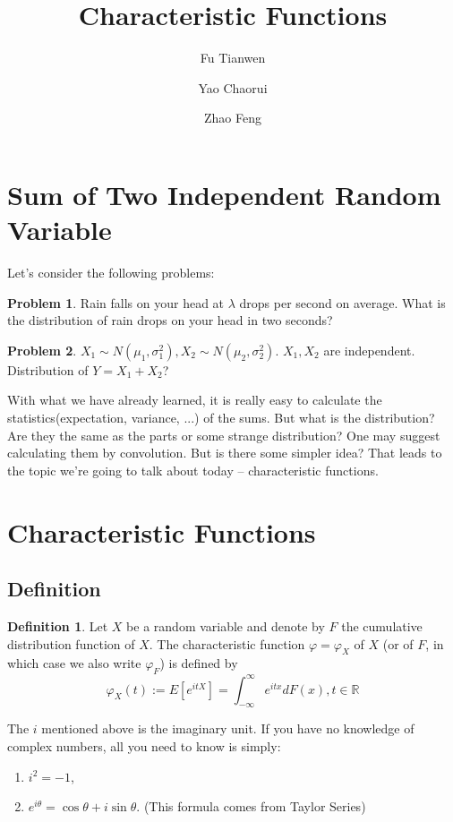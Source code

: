 \documentclass{article}
\title{Characteristic Functions}
\author{Fu Tianwen \and Yao Chaorui \and Zhao Feng}
\theoremstyle{definition}
\newtheorem{definition}{Definition}[section]
\newtheorem{problem}{Problem}
\theoremstyle{plain}
\theoremstyle{remark}
\newcommand{\reals}{\mathbb{R}}
\begin{document}
\maketitle
\section{Sum of Two Independent Random Variable}
Let's consider the following problems:
\begin{problem}
	Rain falls on your head at $\lambda$ drops per second on average. What is the distribution of rain drops on your head in two seconds?
	\label{prb:poisson}
\end{problem}
\begin{problem}
	$X_1\sim N(\mu_1,\sigma_1^2), X_2\sim N(\mu_2,\sigma_2^2).$ $X_1,X_2$ are independent. Distribution of $Y=X_1+X_2$?
	\label{prb:normal}
\end{problem}
\noindent With what we have already learned, it is really easy to calculate the statistics(expectation, variance, ...) of the sums. But what is the distribution? Are they the same as the parts or some strange distribution?
One may suggest calculating them by convolution. But is there some simpler idea?
That leads to the topic we're going to talk about today -- characteristic functions.
\section{Characteristic Functions}
\subsection{Definition}
\begin{definition}
	Let $X$ be a random variable and denote by $F$ the cumulative distribution function of $X$. The characteristic function $\varphi=\varphi_X$ of $X$ (or of $F$, in which case we also write $\varphi_F$) is defined by \cite{cfms}
	$$\varphi_X(t):=E[e^{itX}]=\int_{-\infty}^\infty e^{itx}dF(x), t\in\reals$$
\end{definition}
\noindent The $i$ mentioned above is the imaginary unit. If you have no knowledge of complex numbers, all you need to know is simply:
\begin{enumerate}[$\ast$]
	\item $i^2=-1$,
	\item $e^{i\theta} = \cos\theta + i\sin\theta$. (This formula comes from Taylor Series)
\end{enumerate}
\end{document}
